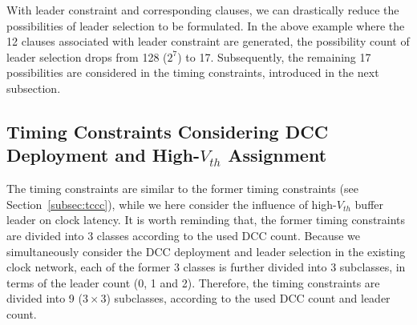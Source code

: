 With leader constraint and corresponding clauses, we can drastically reduce the possibilities of leader selection to be formulated. In the above example where the 12 clauses associated with leader constraint are generated, the possibility count of leader selection drops from 128 ($2^7$) to 17. Subsequently, the remaining 17 possibilities are considered in the timing constraints, introduced in the next subsection.

\subsection{Timing Constraints Considering DCC Deployment and High-$V_{th}$ Assignment}
\label{sec:VTA:timing}
The timing constraints are similar to the former timing constraints (see Section~\ref{subsec:tccc}), while we here consider the influence of high-$V_{th}$ buffer leader on clock latency. It is worth reminding that, the former timing constraints are divided into 3 classes according to the used DCC count. Because we simultaneously consider the DCC deployment and leader selection in the existing clock network, each of the former 3 classes is further divided into 3 subclasses, in terms of the leader count (0, 1 and 2). Therefore, the timing constraints are divided into 9 ($3 \times 3$) subclasses, according to the used DCC count and leader count.


